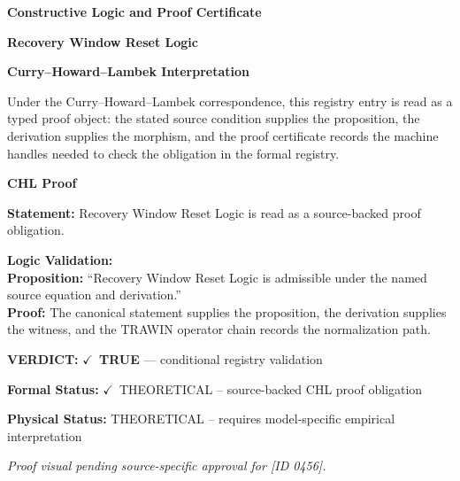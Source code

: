 \clearpage
\begingroup\tzpsupportsetup
\noindent\textbf{\fontsize{10.8pt}{12.8pt}\selectfont [ID 0456] Constructive Logic and Proof Certificate}\par
\noindent\textbf{\fontsize{10pt}{12pt}\selectfont Recovery Window Reset Logic}\par
\vspace{0.45em}
\begingroup
\footnotesize
\setlength{\parskip}{0.22em}
\setlength{\parindent}{0pt}
\noindent\textbf{Curry--Howard--Lambek Interpretation}\par
Under the Curry--Howard--Lambek correspondence, this registry entry is read as a typed proof
object: the stated source condition supplies the proposition, the derivation supplies the
morphism, and the proof certificate records the machine handles needed to check the obligation
in the formal registry.

\vspace{0.45em}
\noindent\textbf{CHL Proof}\par
\textbf{Statement:} Recovery Window Reset Logic is read as a source-backed proof obligation.

\textbf{Logic Validation:}\\
\textbf{Proposition:} ``Recovery Window Reset Logic is admissible under the named source equation and derivation.''\\
\textbf{Proof:} The canonical statement supplies the proposition, the derivation supplies the witness, and the TRAWIN operator chain records the normalization path.

\textbf{VERDICT:} \ensuremath{\checkmark}\ \textbf{TRUE} --- conditional registry validation

\textbf{Formal Status:} \ensuremath{\checkmark}\ THEORETICAL -- source-backed CHL proof obligation

\textbf{Physical Status:} THEORETICAL -- requires model-specific empirical interpretation
\par\vspace{0.45em}
\par
\vfill
\begingroup\footnotesize\itshape
Proof visual pending source-specific approval for [ID 0456].
\par\endgroup
\vfill
\endgroup
\endgroup

